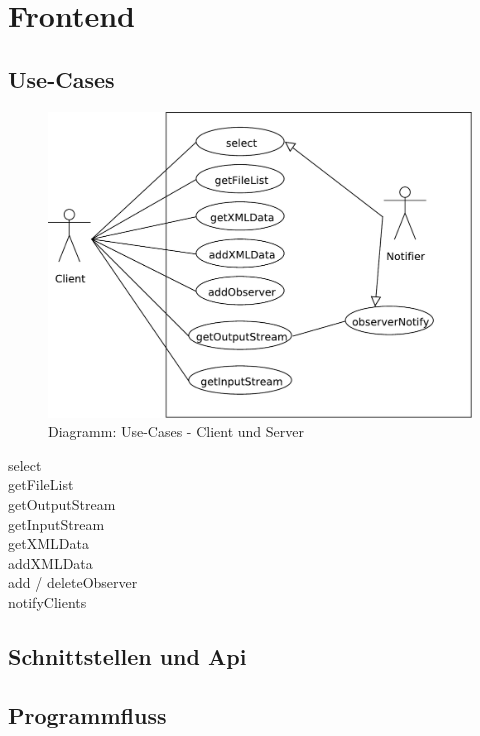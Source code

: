 \chapter{Frontend}
\section{Use-Cases}
\begin{figure}[h]
	\centering
	\label{design:dia:usecase}
	\includegraphics[width=\textwidth]{design/frontend/usecase-client.pdf}
	\caption{Diagramm: Use-Cases - Client und Server}
\end{figure}
\begin{description}
	\item [select]
	\item [getFileList]
	\item [getOutputStream]
	\item [getInputStream]
	\item [getXMLData]
	\item [addXMLData]
	\item [add / deleteObserver]
	\item [notifyClients]
\end{description}

\section{Schnittstellen und Api}

\section{Programmfluss}

